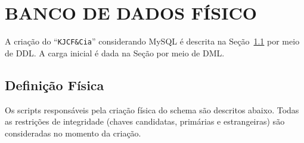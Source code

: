 \documentclass[
12pt,
a4paper,
semrecuonosumario,
sumario = abnt-6027-2012]{report}
\begin{document}
    \chapter{BANCO DE DADOS FÍSICO}\label{chap:fisico}
    A criação do ``\texttt{KJCF\&Cia}'' considerando MySQL é descrita na Seção~\ref{sec:def-fisica} por meio de DDL.
    A carga inicial é dada na Seção por meio de DML.
    
    \section{Definição Física}\label{sec:def-fisica}
    Os scripts responsáveis pela criação física do schema são descritos abaixo. Todas as restrições de integridade
    (chaves candidatas, primárias e estrangeiras) são consideradas no momento da criação.
    
\end{document}
